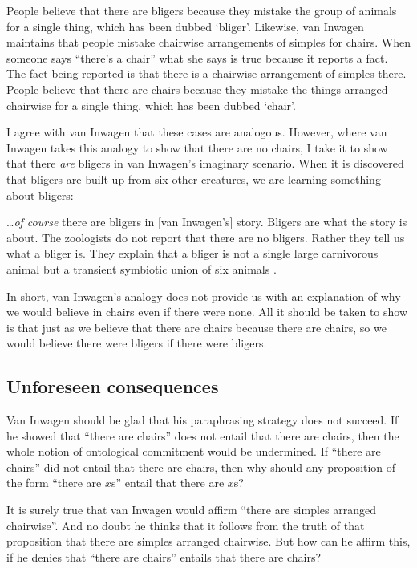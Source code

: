 \documentclass[11pt]{article}
\newenvironment{squote}{%
\begin{spacing}{1}
\begin{list}{}{%
    \setlength{\labelwidth}{0pt}%
    \rightmargin\leftmargin%
  }
\item\relax
}{%
\end{list}%
\end{spacing}
}
\begin{document}
\begin{spacing}{1.5}
People believe that there are bligers because they mistake the group
of animals for a single thing, which has been dubbed `bliger'.
Likewise, van Inwagen maintains that people mistake chairwise
arrangements of simples for chairs.  When someone says ``there's a
chair'' what she says is true because it reports a fact.  The fact
being reported is that there is a chairwise arrangement of simples
there.  People believe that there are chairs because they mistake the
things arranged chairwise for a single thing, which has been dubbed
`chair'.

I agree with van Inwagen that these cases are analogous.  However,
where van Inwagen takes this analogy to show that there are no chairs,
I take it to show that there {\em are} bligers in van Inwagen's
imaginary scenario.  When it is discovered that bligers are built up
from six other creatures, we are learning something about bligers:

\begin{squote}
\ldots {\em of course} there are bligers in [van Inwagen's] story.
Bligers are what the story is about.  The zoologists do not report
that there are no bligers.  Rather they tell us what a bliger is.
They explain that a bliger is not a single large carnivorous animal
but a transient symbiotic union of six animals
\citep[704]{rosenberg1993}.
\end{squote}

In short, van Inwagen's analogy does not provide us with an
explanation of why we would believe in chairs even if there were
none.  All it should be taken to show is that just as we believe that
there are chairs because there are chairs, so we would believe there
were bligers if there were bligers.

\subsection{Unforeseen consequences}
\label{backfire}
Van Inwagen should be glad that his paraphrasing strategy does not
succeed.  If he showed that ``there are chairs'' does not entail that
there are chairs, then the whole notion of ontological commitment
would be undermined.  If ``there are chairs'' did not entail that
there are chairs, then why should any proposition of the form ``there
are $x$s'' entail that there are $x$s?

It is surely true that van Inwagen would affirm ``there are simples
arranged chairwise''.  And no doubt he thinks that it follows from the
truth of that proposition that there are simples arranged chairwise.
But how can he affirm this, if he denies that ``there are chairs''
entails that there are chairs?


\end{spacing}
\end{document}

